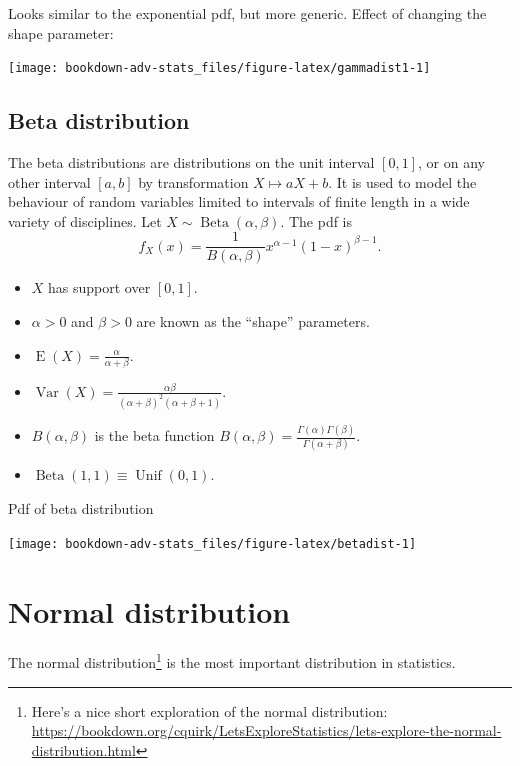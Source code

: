 \documentclass[
]{book}
\providecommand{\tightlist}{%
  \setlength{\itemsep}{0pt}\setlength{\parskip}{0pt}}
\DeclareMathOperator{\E}{E}
\DeclareMathOperator{\Var}{Var}
\DeclareMathOperator{\Betadist}{Beta}
\DeclareMathOperator{\Unif}{Unif}
\theoremstyle{definition}
\theoremstyle{definition}
\theoremstyle{definition}
\theoremstyle{definition}
\theoremstyle{remark}
\begin{document}
Looks similar to the exponential pdf, but more generic.
Effect of changing the shape parameter:

\begin{center}\texttt{[image: bookdown-adv-stats\_files/figure-latex/gammadist1-1]} \end{center}

\hypertarget{beta-distribution}{%
\subsection{Beta distribution}\label{beta-distribution}}

The beta distributions are distributions on the unit interval \([0,1]\), or on any other interval \([a,b]\) by transformation \(X \mapsto aX + b\).
It is used to model the behaviour of random variables limited to intervals of finite length in a wide variety of disciplines.
Let \(X\sim \Betadist(\alpha,\beta)\).
The pdf is
\[
  f_X(x) = \frac{1}{B(\alpha,\beta)} x^{\alpha-1} (1-x)^{\beta-1}.
\]

\begin{itemize}
\tightlist
\item
  \(X\) has support over \([0,1]\).
\item
  \(\alpha>0\) and \(\beta>0\) are known as the ``shape'' parameters.
\item
  \(\E(X)=\frac{\alpha}{\alpha+\beta}\).
\item
  \(\Var(X)=\frac{\alpha\beta}{(\alpha+\beta)^2(\alpha+\beta+1)}\).
\item
  \(B(\alpha,\beta)\) is the beta function \(B(\alpha,\beta) = \frac{\Gamma(\alpha)\Gamma(\beta)}{\Gamma(\alpha+\beta)}\).
\item
  \(\Betadist(1,1)\equiv \Unif(0,1)\).
\end{itemize}

Pdf of beta distribution

\begin{center}\texttt{[image: bookdown-adv-stats\_files/figure-latex/betadist-1]} \end{center}

\hypertarget{normal-distribution}{%
\section{Normal distribution}\label{normal-distribution}}

The normal distribution\footnote{Here's a nice short exploration of the normal distribution: \url{https://bookdown.org/cquirk/LetsExploreStatistics/lets-explore-the-normal-distribution.html}} is the most important distribution in statistics.
\end{document}
